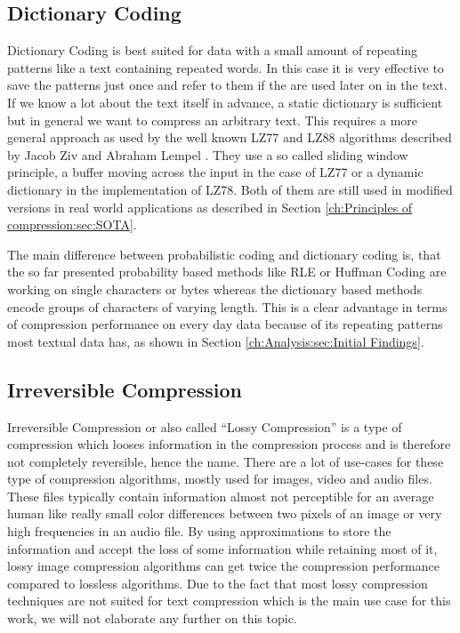 \subsection{Dictionary Coding}
\par{
Dictionary Coding is best suited for data with a small amount of repeating patterns like a text containing repeated words. In this case it is very effective to save the patterns just once and refer to them if the are used later on in the text. If we know a lot about the text itself in advance, a static dictionary is sufficient but in general we want to compress an arbitrary text. This requires a more general approach as used by the well known LZ77 and LZ88 algorithms described by Jacob Ziv and Abraham Lempel \cite{lz}. They use a so called sliding window principle, a buffer moving across the input in the case of LZ77 or a dynamic dictionary in the implementation of LZ78. Both of them are still used in modified versions in real world applications as described in Section \ref{ch:Principles of compression:sec:SOTA}.
}
\par{
The main difference between probabilistic coding and dictionary coding is, that the so far presented probability based methods like RLE or Huffman Coding are working on single characters or bytes whereas the dictionary based methods encode groups of characters of varying length. This is a clear advantage in terms of compression performance on every day data because of its repeating patterns most textual data has, as shown in Section \ref{ch:Analysis:sec:Initial Findings}.
}


\subsection{Irreversible Compression}
\par{
Irreversible Compression or also called \enquote{Lossy Compression} is a type of compression which looses information in the compression process and is therefore not completely reversible, hence the name. There are a lot of use-cases for these type of compression algorithms, mostly used for images, video and audio files. These files typically contain information almost not perceptible for an average human like really small color differences between two pixels of an image or very high frequencies in an audio file. By using approximations to store the information and accept the loss of some information while retaining most of it, lossy image compression algorithms can get twice the compression performance compared to lossless algorithms. Due to the fact that most lossy compression techniques are not suited for text compression which is the main use case for this work, we will not elaborate any further on this topic.
}


